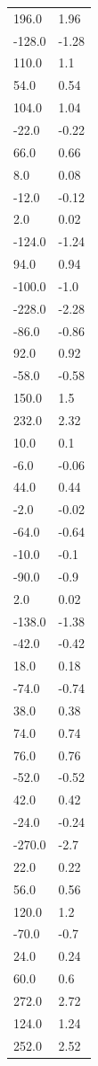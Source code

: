 \begin{longtable}{ll}
196.0 & 1.96 \\
-128.0 & -1.28 \\
110.0 & 1.1 \\
54.0 & 0.54 \\
104.0 & 1.04 \\
-22.0 & -0.22 \\
66.0 & 0.66 \\
8.0 & 0.08 \\
-12.0 & -0.12 \\
2.0 & 0.02 \\
-124.0 & -1.24 \\
94.0 & 0.94 \\
-100.0 & -1.0 \\
-228.0 & -2.28 \\
-86.0 & -0.86 \\
92.0 & 0.92 \\
-58.0 & -0.58 \\
150.0 & 1.5 \\
232.0 & 2.32 \\
10.0 & 0.1 \\
-6.0 & -0.06 \\
44.0 & 0.44 \\
-2.0 & -0.02 \\
-64.0 & -0.64 \\
-10.0 & -0.1 \\
-90.0 & -0.9 \\
2.0 & 0.02 \\
-138.0 & -1.38 \\
-42.0 & -0.42 \\
18.0 & 0.18 \\
-74.0 & -0.74 \\
38.0 & 0.38 \\
74.0 & 0.74 \\
76.0 & 0.76 \\
-52.0 & -0.52 \\
42.0 & 0.42 \\
-24.0 & -0.24 \\
-270.0 & -2.7 \\
22.0 & 0.22 \\
56.0 & 0.56 \\
120.0 & 1.2 \\
-70.0 & -0.7 \\
24.0 & 0.24 \\
60.0 & 0.6 \\
272.0 & 2.72 \\
124.0 & 1.24 \\
252.0 & 2.52 \\

\end{longtable}
